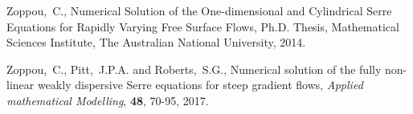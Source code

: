 \documentclass[subeqn]{article}
\begin{document}
\begin{thebibliography}{99}
 Zoppou,~C., Numerical Solution of the One-dimensional and Cylindrical Serre Equations for Rapidly Varying Free Surface Flows, Ph.D. Thesis, Mathematical Sciences Institute, The Australian National University, 2014.

 Zoppou,~C., Pitt,~J.P.A. and Roberts,~S.G., Numerical solution of the fully non-linear weakly dispersive Serre equations for steep gradient flows, \emph{Applied mathematical Modelling}, \textbf{48}, 70-95, 2017.

\end{thebibliography}
\end{document}
